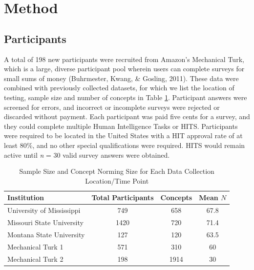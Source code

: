 \documentclass[english,,man]{apa6}
\begin{document}
\hypertarget{method}{%
\section{Method}\label{method}}

\hypertarget{participants}{%
\subsection{Participants}\label{participants}}

A total of 198 new participants were recruited from Amazon's Mechanical Turk, which is a large, diverse participant pool wherein users can complete surveys for small sums of money (Buhrmester, Kwang, \& Gosling, 2011). These data were combined with previously collected datasets, for which we list the location of testing, sample size and number of concepts in Table \ref{tab:part-table}. Participant answers were screened for errors, and incorrect or incomplete surveys were rejected or discarded without payment. Each participant was paid five cents for a survey, and they could complete multiple Human Intelligence Tasks or HITS. Participants were required to be located in the United States with a HIT approval rate of at least 80\%, and no other special qualifications were required. HITS would remain active until \emph{n} = 30 valid survey answers were obtained.

\begin{table}[tbp]
\begin{center}
\begin{threeparttable}
\caption{\label{tab:part-table}Sample Size and Concept Norming Size for Each Data Collection Location/Time Point}
\begin{tabular}{lccc}
\toprule
Institution & Total Participants & Concepts & Mean $N$\\
\midrule
University of Mississippi & 749 & 658 & 67.8\\
Missouri State University & 1420 & 720 & 71.4\\
Montana State University & 127 & 120 & 63.5\\
Mechanical Turk 1 & 571 & 310 & 60\\
Mechanical Turk 2 & 198 & 1914 & 30\\
\bottomrule
\end{tabular}
\end{threeparttable}
\end{center}
\end{table}
\end{document}
